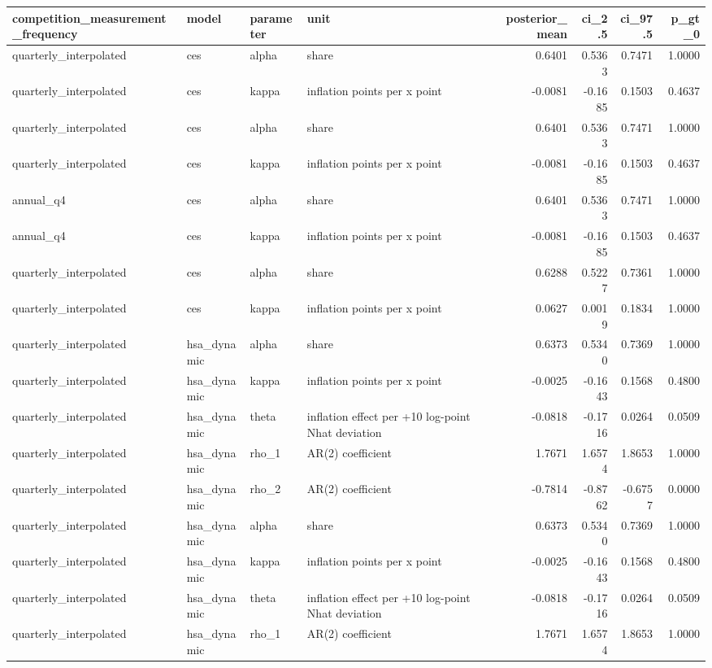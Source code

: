 \begin{tabular}{llllrrrr}
\toprule
competition\_measurement\_frequency & model & parameter & unit & posterior\_mean & ci\_2.5 & ci\_97.5 & p\_gt\_0 \\
\midrule
quarterly\_interpolated & ces & alpha & share & 0.6401 & 0.5363 & 0.7471 & 1.0000 \\
quarterly\_interpolated & ces & kappa & inflation points per x point & -0.0081 & -0.1685 & 0.1503 & 0.4637 \\
quarterly\_interpolated & ces & alpha & share & 0.6401 & 0.5363 & 0.7471 & 1.0000 \\
quarterly\_interpolated & ces & kappa & inflation points per x point & -0.0081 & -0.1685 & 0.1503 & 0.4637 \\
annual\_q4 & ces & alpha & share & 0.6401 & 0.5363 & 0.7471 & 1.0000 \\
annual\_q4 & ces & kappa & inflation points per x point & -0.0081 & -0.1685 & 0.1503 & 0.4637 \\
quarterly\_interpolated & ces & alpha & share & 0.6288 & 0.5227 & 0.7361 & 1.0000 \\
quarterly\_interpolated & ces & kappa & inflation points per x point & 0.0627 & 0.0019 & 0.1834 & 1.0000 \\
quarterly\_interpolated & hsa\_dynamic & alpha & share & 0.6373 & 0.5340 & 0.7369 & 1.0000 \\
quarterly\_interpolated & hsa\_dynamic & kappa & inflation points per x point & -0.0025 & -0.1643 & 0.1568 & 0.4800 \\
quarterly\_interpolated & hsa\_dynamic & theta & inflation effect per +10 log-point Nhat deviation & -0.0818 & -0.1716 & 0.0264 & 0.0509 \\
quarterly\_interpolated & hsa\_dynamic & rho\_1 & AR(2) coefficient & 1.7671 & 1.6574 & 1.8653 & 1.0000 \\
quarterly\_interpolated & hsa\_dynamic & rho\_2 & AR(2) coefficient & -0.7814 & -0.8762 & -0.6757 & 0.0000 \\
quarterly\_interpolated & hsa\_dynamic & alpha & share & 0.6373 & 0.5340 & 0.7369 & 1.0000 \\
quarterly\_interpolated & hsa\_dynamic & kappa & inflation points per x point & -0.0025 & -0.1643 & 0.1568 & 0.4800 \\
quarterly\_interpolated & hsa\_dynamic & theta & inflation effect per +10 log-point Nhat deviation & -0.0818 & -0.1716 & 0.0264 & 0.0509 \\
quarterly\_interpolated & hsa\_dynamic & rho\_1 & AR(2) coefficient & 1.7671 & 1.6574 & 1.8653 & 1.0000 \\

\end{tabular}
